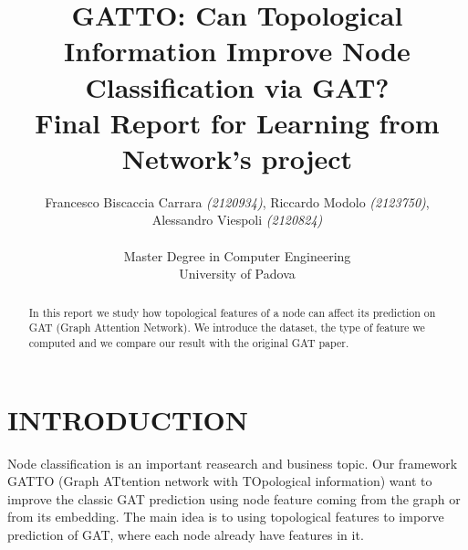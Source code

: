 \documentclass[12pt,conference]{ieeeconf} %
\title{GATTO: Can Topological Information Improve Node Classification via GAT?\\
\large Final Report for Learning from Network's project \\}
\author{Francesco Biscaccia Carrara \textit{(2120934)}, Riccardo Modolo \textit{(2123750)},\\ Alessandro Viespoli \textit{(2120824)} %
\\\\ Master Degree in Computer Engineering \\
University of Padova \\
}
\begin{document}
\maketitle
\thispagestyle{plain}
\pagestyle{plain}

\begin{abstract}
    In this report we study how topological features of a node can affect its prediction on GAT (Graph Attention Network).
We introduce the dataset, the type of feature we computed and we compare our result with the 
original GAT paper.
    
\end{abstract}


\section{INTRODUCTION} 
Node classification is an important reasearch and business topic.
Our framework GATTO (Graph ATtention network with TOpological information) want to 
improve the classic GAT prediction using node feature coming from the graph or from its 
embedding. The main idea is to using topological features to imporve prediction of GAT, where each node already have features in it. 

\end{document}
